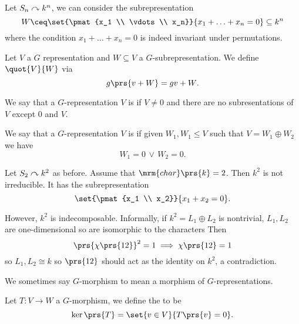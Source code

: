 \documentclass[10pt,a4paper,twoside,openany,hidelinks]{book}
\begin{document}
\begin{example}
Let $S_n \curvearrowright k^n$, we can consider the subrepresentation
\[W \ceq \set{\pmat{x_1 \\ \vdots \\ x_n}}{x_1 + \ldots + x_n = 0} \subseteq k^n\]
where the condition $x_1 + \ldots + x_n = 0$ is indeed invariant under permutations.
\end{example}

\begin{definition}
Let $V$ a $G$ representation and $W \subseteq V$ a $G$-subrepresentation.
We define  $\quot{V}{W}$ via
\[g\prs{v + W} = gv + W \text{.}\]
\end{definition}

\begin{definition}
We say that a $G$-representation $V$ is  if $V \neq 0$ and there are no subresentations of $V$ except $0$ and $V$.
\end{definition}

\begin{definition}
We say that a $G$-representation $V$ is  if given $W_1, W_1 \leq V$ such that $V = W_1 \oplus W_2$ we have \[W_1 = 0 \, \vee \, W_2 = 0 \text{.}\]
\end{definition}

\begin{example}
Let $S_2 \curvearrowright k^2$ as before.
Assume that $\mrm{char}\prs{k} = 2$.
Then $k^2$ is not irreducible. It has the subrepresentation \[\set{\pmat{x_1 \\ x_2}}{x_1 + x_2 = 0} \text{.}\]

However, $k^2$ is indecomposable.
Informally, if $k^2 = L_1 \oplus L_2$ is nontrivial, $L_1, L_2$ are one-dimensional so are isomorphic to the characters %
Then
\[\prs{\chi\prs{1 2}}^2 = 1 \implies \chi\prs{1 2} = 1\]
so $L_1, L_2 \cong k$ so $\prs{1 2}$ should act as the identity on $k^2$, a contradiction.
\end{example}

\begin{notation}
We sometimes say $G$-morphism to mean a morphism of $G$-representations.
\end{notation}

\begin{definition}[Kernel]
Let $T \colon V \to W$ a $G$-morphism, we define the  to be
\[\ker\prs{T} = \set{v \in V}{T\prs{v} = 0} \text{.}\]
\end{definition}
\end{document}
